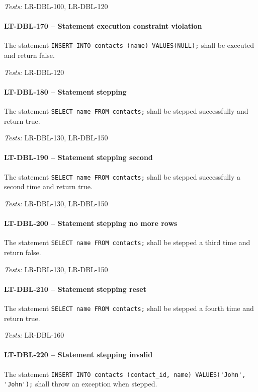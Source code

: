\textit{Tests: } LR-DBL-100, LR-DBL-120

\paragraph{LT-DBL-170 -- Statement execution constraint violation}
The statement \lstinline{INSERT INTO contacts (name) VALUES(NULL);}
shall be executed and return false.

\textit{Tests: } LR-DBL-120

\paragraph{LT-DBL-180 -- Statement stepping}
The statement \lstinline{SELECT name FROM contacts;} shall be
stepped successfully and return true.

\textit{Tests: } LR-DBL-130, LR-DBL-150

\paragraph{LT-DBL-190 -- Statement stepping second}
The statement \lstinline{SELECT name FROM contacts;} shall
be stepped successfully a second time and return true.

\textit{Tests: } LR-DBL-130, LR-DBL-150

\paragraph{LT-DBL-200 -- Statement stepping no more rows}
The statement \lstinline{SELECT name FROM contacts;} shall
be stepped a third time and return false.

\textit{Tests: } LR-DBL-130, LR-DBL-150

\paragraph{LT-DBL-210 -- Statement stepping reset}
The statement \lstinline{SELECT name FROM contacts;} shall
be stepped a fourth time and return true.

\textit{Tests: } LR-DBL-160

\paragraph{LT-DBL-220 -- Statement stepping invalid}
The statement \lstinline{INSERT INTO contacts (contact_id, name) VALUES('John', 'John');}
shall throw an exception when stepped.

